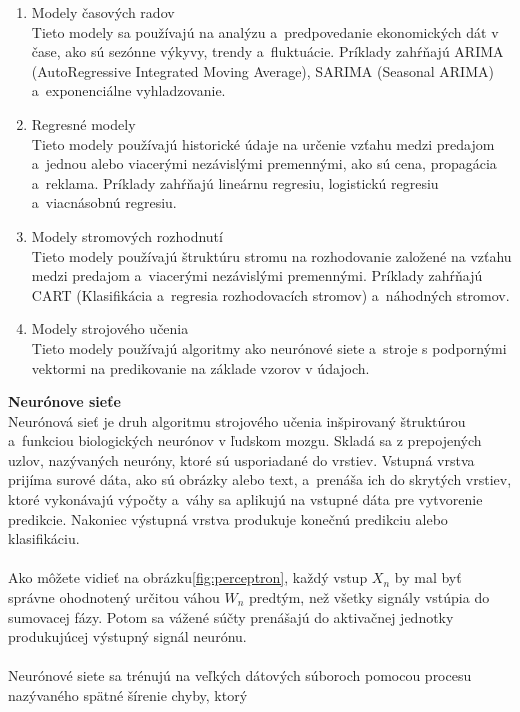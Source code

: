     \begin{enumerate}
        \item Modely časových radov
        \\Tieto modely sa používajú na analýzu a~predpovedanie ekonomických dát v čase,
        ako sú sezónne výkyvy, trendy a~fluktuácie. Príklady zahŕňajú ARIMA (AutoRegressive Integrated Moving Average),
        SARIMA (Seasonal ARIMA) a~exponenciálne vyhladzovanie.
        \item Regresné modely\\
        Tieto modely používajú historické údaje na určenie vzťahu medzi predajom a~jednou alebo
        viacerými nezávislými premennými, ako sú cena, propagácia a~reklama. Príklady zahŕňajú lineárnu regresiu,
        logistickú regresiu a~viacnásobnú regresiu.
        \item Modely stromových rozhodnutí\\
        Tieto modely používajú štruktúru stromu na rozhodovanie založené na vzťahu medzi
        predajom a~viacerými nezávislými premennými. Príklady zahŕňajú CART (Klasifikácia a~regresia rozhodovacích
        stromov) a~náhodných stromov.
        \item Modely strojového učenia\\
        Tieto modely používajú algoritmy ako neurónové siete a~stroje s podpornými vektormi na predikovanie
        na základe vzorov v údajoch.
    \end{enumerate}
    \textbf{Neurónove sieťe} \\
    Neurónová sieť je druh algoritmu strojového učenia inšpirovaný štruktúrou\\a~funkciou biologických neurónov v
    ľudskom mozgu. Skladá sa z prepojených uzlov, nazývaných neuróny, ktoré sú usporiadané do vrstiev. Vstupná vrstva
    prijíma surové dáta, ako sú obrázky alebo text, a~prenáša ich do skrytých vrstiev, ktoré vykonávajú výpočty a~váhy
    sa aplikujú na vstupné dáta pre vytvorenie predikcie. Nakoniec výstupná vrstva produkuje konečnú predikciu
    alebo klasifikáciu.\\
    \\
    Ako môžete vidieť na obrázku\ref{fig:perceptron}, každý vstup $X_n$ by mal byť správne ohodnotený určitou
    váhou $W_n$ predtým, než všetky signály vstúpia do sumovacej fázy. Potom sa vážené súčty prenášajú do aktivačnej
    jednotky produkujúcej výstupný signál neurónu.\\
    \\
    Neurónové siete sa trénujú na veľkých dátových súboroch pomocou procesu nazývaného spätné šírenie chyby, ktorý

